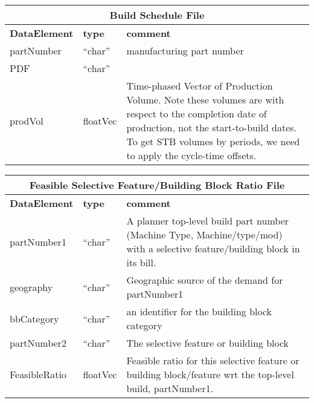 \vspace{.5in}

\begin{tabular}{llp{4in}}
\multicolumn{3}{c}{{\bf Build Schedule File}}\\ \hline\hline
{\bf DataElement} &  {\bf type}  &   {\bf comment} \\ \hline
partNumber & ``char''  & manufacturing part number \\
PDF        & ``char''  \\
prodVol    & floatVec&  Time-phased Vector of Production Volume.  Note
                      these volumes are with respect to the completion
                      date of production, not the start-to-build dates.
                      To get STB volumes by periods, we need to apply
                      the cycle-time offsets. \\
\end{tabular}

\vspace{.5in}

\begin{tabular}{llp{4in}}
\multicolumn{3}{c}{{\bf Feasible Selective Feature/Building Block Ratio File}}\\ \hline\hline
{\bf DataElement} &  {\bf type}  &   {\bf comment} \\ \hline
partNumber1  & ``char'' &       A planner top-level build part number 
                            (Machine Type, Machine/type/mod)
                            with a selective feature/building block in its bill.  \\
geography   & ``char''    &      Geographic source of the demand for partNumber1 \\
bbCategory &  ``char'' &    an identifier for the building block category  \\
partNumber2  & ``char'' &      The selective feature or building block \\

FeasibleRatio    & floatVec &   Feasible ratio for this selective feature or 
                            building block/feature wrt the top-level build, partNumber1. \\
\end{tabular}

\vspace{.5in}

